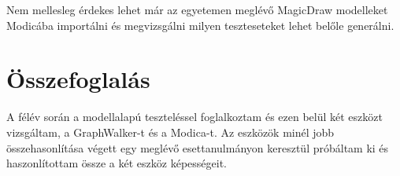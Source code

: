 Nem mellesleg érdekes lehet már az egyetemen meglévő MagicDraw modelleket Modicába importálni és megvizsgálni milyen teszteseteket lehet belőle generálni.

\section{Összefoglalás}
A félév során a modellalapú teszteléssel foglalkoztam és ezen belül két eszközt vizsgáltam, a GraphWalker-t és a Modica-t. Az eszközök minél jobb összehasonlítása végett egy meglévő esettanulmányon keresztül próbáltam ki és haszonlítottam össze a két eszköz képességeit.